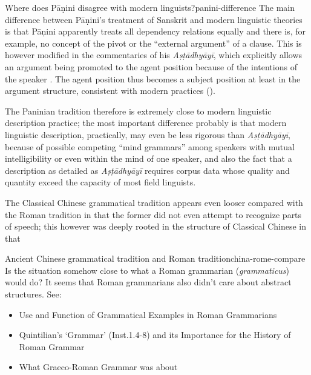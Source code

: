 \documentclass[UTF8, a4paper, oneside, scheme=plain, 12pt]{ctexrep}
\newcommand{\form}[1]{\emph{#1}}
\newcommand{\work}[1]{\textit{#1}}
\begin{document}
\begin{theorybox}{Where does Pāṇini disagree with modern linguists?}{panini-difference}
    The main difference between Pāṇini's treatment of Sanskrit and modern linguistic theories
    is that Pāṇini apparently treats all dependency relations equally
    and there is, for example, no concept of the pivot or the ``external argument'' of a clause.
    This is however modified in the commentaries of his \work{Aṣṭādhyāyī},
    which explicitly allows an argument being promoted to the agent position 
    because of the intentions of the speaker \citep{keidan2017subjecthood}.
    The agent position thus becomes a subject position at least in the argument structure, consistent with modern practices ().

    The Paninian tradition therefore is extremely close to modern linguistic description practice;
    the most important difference probably is that
    modern linguistic description, practically, may even be less rigorous than \work{Aṣṭādhyāyī},
    because of possible competing ``mind grammars'' among speakers with mutual intelligibility
    or even within the mind of one speaker,
    and also the fact that a description as detailed as \work{Aṣṭādhyāyī}
    requires corpus data whose quality and quantity exceed the capacity of most field linguists.
\end{theorybox}

The Classical Chinese grammatical tradition appears even looser compared with the Roman tradition
in that the former did not even attempt to recognize parts of speech;
this however was deeply rooted in the structure of Classical Chinese
in that 

\begin{todobox}{Ancient Chinese grammatical tradition and Roman tradition}{china-rome-compare}
    Is the situation somehow close to what a Roman grammarian (\form{grammaticus}) would do?
    It seems that Roman grammarians also didn't care about abstract structures.
    See:
    \begin{itemize}
        \item Use and Function of Grammatical Examples in Roman Grammarians
        \item Quintilian’s ‘Grammar’ (Inst.1.4-8) and its Importance for the History of Roman Grammar
        \item What Graeco-Roman Grammar was about
    \end{itemize}
\end{todobox}
\end{document}
